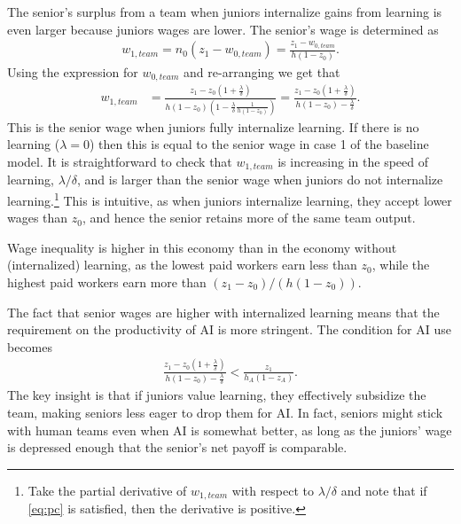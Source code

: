 \documentclass[12pt]{article}
\begin{document}
{The senior's surplus from a team when juniors internalize gains from learning is even larger because juniors wages are lower. The senior's wage is determined as
\begin{align*}
w_{1,team}=n_0(z_1-w_{0,team})=\frac{z_1-w_{0,team}}{h(1-z_0)}.
\end{align*}
Using the expression for $w_{0,team}$ and re-arranging we get that
\begin{align*}
w_{1,team} &= \frac{z_1-z_0(1+\frac{\lambda}{\delta})}{h(1-z_0)(1-\frac{\lambda}{\delta}\frac{1}{h(1-z_0)})}=\frac{z_1-z_0(1+\frac{\lambda}{\delta})}{h(1-z_0)-\frac{\lambda}{\delta}}.
\end{align*}
This is the senior wage when juniors fully internalize learning. If there is no learning ($\lambda=0$) then this is equal to the senior wage in case 1 of the baseline model. It is straightforward to check that $w_{1,team}$ is increasing in the speed of learning, $\lambda/\delta$, and is larger than the senior wage when juniors do not internalize learning.\footnote{Take the partial derivative of $w_{1,team}$ with respect to $\lambda/\delta$ and note that if \eqref{eq:pc} is satisfied, then the derivative is positive.} This is intuitive, as when juniors internalize learning, they accept lower wages than $z_0$, and hence the senior retains more of the same team output.

Wage inequality is higher in this economy than in the economy without (internalized) learning, as the lowest paid workers earn less than $z_0$, while the highest paid workers earn more than $(z_1-z_0)/(h(1-z_0))$.  

The fact that senior wages are higher with internalized learning means that the requirement on the productivity of AI is more stringent. The condition for AI use becomes 
\begin{align*}
\frac{z_1-z_0(1+\frac{\lambda}{\delta})}{h(1-z_0)-\frac{\lambda}{\delta}} < \frac{z_1}{h_A(1-z_A)}.
\end{align*}
The key insight is that if juniors value learning, they effectively subsidize the team, making seniors less eager to drop them for AI. In fact, seniors might stick with human teams even when AI is somewhat better, as long as the
juniors' wage is depressed enough that the senior's net payoff is comparable. 

}
\end{document}
